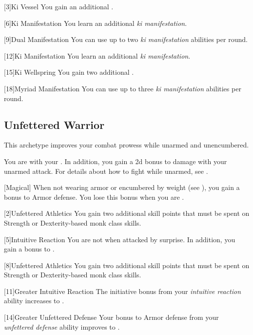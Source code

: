         [3]{Ki Vessel} You gain an additional .

        [6]{Ki Manifestation}
        You learn an additional \textit{ki manifestation}.

        [9]{Dual Manifestation} You can use up to two \textit{ki manifestation} abilities per round.

        [12]{Ki Manifestation}
        You learn an additional \textit{ki manifestation}.

        [15]{Ki Wellspring} You gain two additional .

        [18]{Myriad Manifestation} You can use up to three \textit{ki manifestation} abilities per round.

    \subsection{Unfettered Warrior}
        This archetype improves your combat prowess while unarmed and unencumbered.

        You are  with your .
        In addition, you gain a \plus2d bonus to damage with your unarmed attack.
        For details about how to fight while unarmed, see .

        [Magical]
        When not wearing armor or encumbered by weight (see ), you gain a  bonus to Armor defense.
        You lose this bonus when you are \helpless.

        [2]{Unfettered Athletics} You gain two additional skill points that must be spent on Strength or Dexterity-based monk class skills.

        [5]{Intuitive Reaction}
        You are not \unaware when attacked by surprise.
        In addition, you gain a  bonus to .

        [8]{Unfettered Athletics} You gain two additional skill points that must be spent on Strength or Dexterity-based monk class skills.

        [11]{Greater Intuitive Reaction}
        The initiative bonus from your \textit{intuitive reaction} ability increases to .

        [14]{Greater Unfettered Defense}
        Your bonus to Armor defense from your \textit{unfettered defense} ability improves to .

